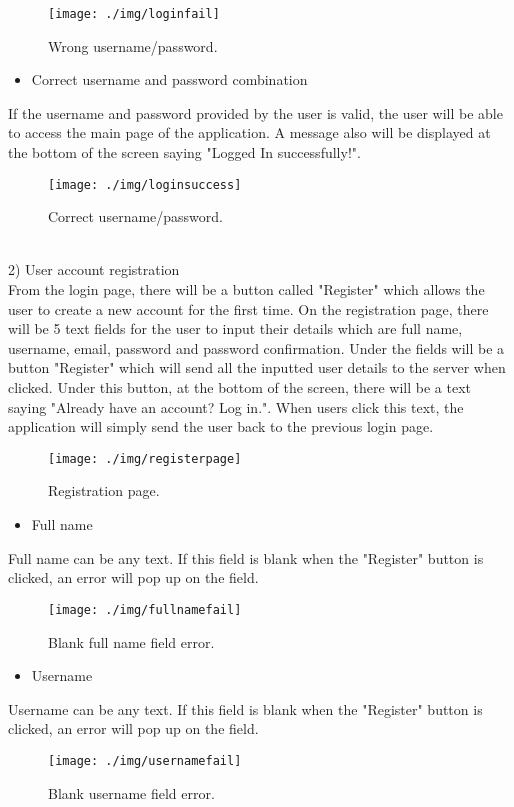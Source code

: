 \documentclass[conference]{IEEEtran}
\begin{document}
\begin{figure}[h!]
\texttt{[image: ./img/loginfail]}
\centering
\caption{Wrong username/password.}
\end{figure}

\begin{itemize}
\item Correct username and password combination
\end{itemize}
If the username and password provided by the user is valid, the user will be able to access the main page of the application. A message also will be displayed at the bottom of the screen saying "Logged In successfully!".

\begin{figure}[h!]
\texttt{[image: ./img/loginsuccess]}
\centering
\caption{Correct username/password.}
\end{figure}

\\2) User account registration\\
From the login page, there will be a button called "Register" which allows the user to create a new account for the first time. On the registration page, there will be 5 text fields for the user to input their details which are full name, username, email, password and password confirmation. Under the fields will be a button "Register" which will send all the inputted user details to the server when clicked. Under this button, at the bottom of the screen, there will be a text saying "Already have an account? Log in.". When users click this text, the application will simply send the user back to the previous login page.

\begin{figure}[h!]
\texttt{[image: ./img/registerpage]}
\centering
\caption{Registration page.}
\end{figure}

\begin{itemize}
\item Full name
\end{itemize}
Full name can be any text. If this field is blank when the "Register" button is clicked, an error will pop up on the field. 
\begin{figure}[h!]
\texttt{[image: ./img/fullnamefail]}
\centering
\caption{Blank full name field error.}
\end{figure}

\begin{itemize}
\item Username
\end{itemize}
Username can be any text. If this field is blank when the "Register" button is clicked, an error will pop up on the field. 
\begin{figure}[h!]
\texttt{[image: ./img/usernamefail]}
\centering
\caption{Blank username field error.}
\end{figure}
\end{document}
